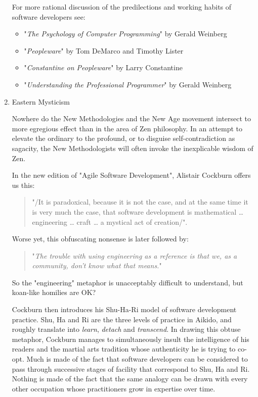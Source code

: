 \documentclass{article}
\begin{document}
\begin{enumerate}
For more rational discussion of the predilections and working habits of
software developers see:

\begin{itemize}
\item "\emph{The Psychology of Computer Programming}" by Gerald Weinberg
\item "\emph{Peopleware}" by Tom DeMarco and Timothy Lister
\item "\emph{Constantine on Peopleware}" by Larry Constantine
\item "\emph{Understanding the Professional Programmer}" by Gerald Weinberg
\end{itemize}

\item Eastern Mysticism
\label{sec:orgheadline200}

Nowhere do the New Methodologies and the New Age movement intersect to
more egregious effect than in the area of Zen philosophy. In an attempt
to elevate the ordinary to the profound, or to disguise
self-contradiction as sagacity, the New Methodologists will often invoke
the inexplicable wisdom of Zen.

In the new edition of "Agile Software Development", Alistair Cockburn
offers us this:

\begin{quote}
"/It is paradoxical, because it is not the case, and at the same time
it is very much the case, that software development is mathematical
\ldots{} engineering \ldots{} craft \ldots{} a mystical act of creation/".
\end{quote}

Worse yet, this obfuscating nonsense is later followed by:

\begin{quote}
"\emph{The trouble with using engineering as a reference is that we, as a
community, don't know what that means.}"
\end{quote}

So the "engineering" metaphor is unacceptably difficult to understand,
but koan-like homilies are OK?

Cockburn then introduces his Shu-Ha-Ri model of software development
practice. Shu, Ha and Ri are the three levels of practice in Aikido, and
roughly translate into \emph{learn}, \emph{detach} and \emph{transcend}. In drawing
this obtuse metaphor, Cockburn manages to simultaneously insult the
intelligence of his readers and the martial arts tradition whose
authenticity he is trying to co-opt. Much is made of the fact that
software developers can be considered to pass through successive stages
of facility that correspond to Shu, Ha and Ri. Nothing is made of the
fact that the same analogy can be drawn with every other occupation
whose practitioners grow in expertise over time.


\end{enumerate}
\end{document}
